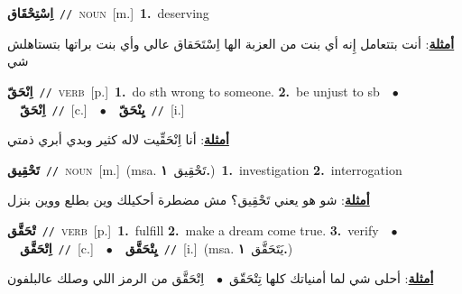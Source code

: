 \documentclass[10pt,a4paper,twoside]{article} %
\begin{document}
\begin{multicols}{2}
{\setlength\topsep{0pt}\textbf{\foreignlanguage{arabic}{اِسْتِحْقَاق}}\ {\color{gray}\texttt{//}\color{black}}\ \textsc{noun}\ [m.]\ \textbf{1.}~deserving\  \begin{flushright}\color{gray}\foreignlanguage{arabic}{\textbf{\underline{\foreignlanguage{arabic}{أمثلة}}}: أنت بتتعامل إِنه أي بنت من العزبة الها اِسْتَحَقاق عالي وأي بنت براتها بتستاهلش شي}\end{flushright}\color{black}} \vspace{2mm}

{\setlength\topsep{0pt}\textbf{\foreignlanguage{arabic}{اِنْحَقّ}}\ {\color{gray}\texttt{//}\color{black}}\ \textsc{verb}\ [p.]\ \textbf{1.}~do sth wrong to someone.  \textbf{2.}~be unjust to sb\ \ $\bullet$\ \ \setlength\topsep{0pt}\textbf{\foreignlanguage{arabic}{اِنْحَقّ}}\ {\color{gray}\texttt{//}\color{black}}\ [c.]\ \ $\bullet$\ \ \setlength\topsep{0pt}\textbf{\foreignlanguage{arabic}{يِنْحَقّ}}\ {\color{gray}\texttt{//}\color{black}}\ [i.]\  \begin{flushright}\color{gray}\foreignlanguage{arabic}{\textbf{\underline{\foreignlanguage{arabic}{أمثلة}}}: أنا اِنْحَقِّيت لاله كثير وبدي أبري ذمتي}\end{flushright}\color{black}} \vspace{2mm}

{\setlength\topsep{0pt}\textbf{\foreignlanguage{arabic}{تَحْقِيق}}\ {\color{gray}\texttt{//}\color{black}}\ \textsc{noun}\ [m.]\ \color{gray}(msa. \foreignlanguage{arabic}{تَحْقِيق}~\foreignlanguage{arabic}{\textbf{١.}})\color{black}\ \textbf{1.}~investigation  \textbf{2.}~interrogation\  \begin{flushright}\color{gray}\foreignlanguage{arabic}{\textbf{\underline{\foreignlanguage{arabic}{أمثلة}}}: شو هو يعني تَحْقِيق؟ مش مضطرة أحكيلك وين بطلع ووين بنزل}\end{flushright}\color{black}} \vspace{2mm}

{\setlength\topsep{0pt}\textbf{\foreignlanguage{arabic}{تْحَقَّق}}\ {\color{gray}\texttt{//}\color{black}}\ \textsc{verb}\ [p.]\ \textbf{1.}~fulfill  \textbf{2.}~make a dream come true.  \textbf{3.}~verify\ \ $\bullet$\ \ \setlength\topsep{0pt}\textbf{\foreignlanguage{arabic}{اِتْحَقَّق}}\ {\color{gray}\texttt{//}\color{black}}\ [c.]\ \ $\bullet$\ \ \setlength\topsep{0pt}\textbf{\foreignlanguage{arabic}{يِتْحَقَّق}}\ {\color{gray}\texttt{//}\color{black}}\ [i.]\ \color{gray}(msa. \foreignlanguage{arabic}{يَتَحَقَّق}~\foreignlanguage{arabic}{\textbf{١.}})\color{black}\  \begin{flushright}\color{gray}\foreignlanguage{arabic}{\textbf{\underline{\foreignlanguage{arabic}{أمثلة}}}: أحلى شي لما أمنياتك كلها تِتْحَقّق\ $\bullet$\ \  اِتْحَقَّق من الرمز اللي وصلك عالبلفون}\end{flushright}\color{black}} \vspace{2mm}


\end{multicols}
\end{document}
